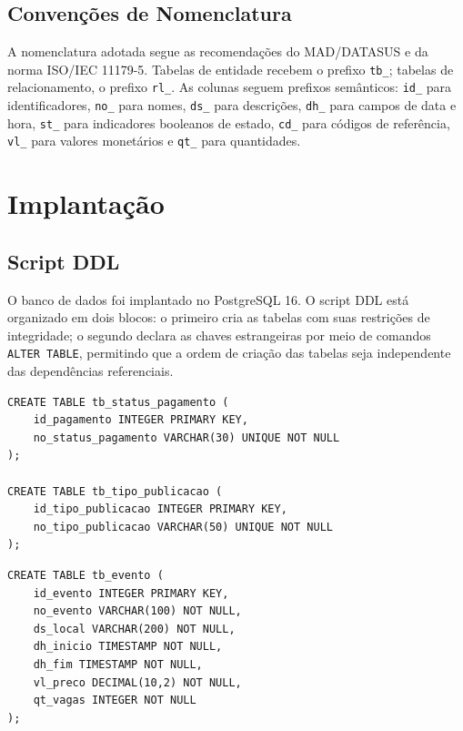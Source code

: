 \documentclass[12pt,a4paper]{article}
\begin{document}
\subsection{Convenções de Nomenclatura}
\label{subsec:nomenclatura}

A nomenclatura adotada segue as recomendações do MAD/DATASUS e da norma ISO/IEC 11179-5. Tabelas de entidade recebem o prefixo \texttt{tb\_}; tabelas de relacionamento, o prefixo \texttt{rl\_}. As colunas seguem prefixos semânticos: \texttt{id\_} para identificadores, \texttt{no\_} para nomes, \texttt{ds\_} para descrições, \texttt{dh\_} para campos de data e hora, \texttt{st\_} para indicadores booleanos de estado, \texttt{cd\_} para códigos de referência, \texttt{vl\_} para valores monetários e \texttt{qt\_} para quantidades.

\section{Implantação}
\label{sec:implantacao}

\subsection{Script DDL}
\label{subsec:ddl}

O banco de dados foi implantado no PostgreSQL 16. O script DDL está organizado em dois blocos: o primeiro cria as tabelas com suas restrições de integridade; o segundo declara as chaves estrangeiras por meio de comandos \texttt{ALTER TABLE}, permitindo que a ordem de criação das tabelas seja independente das dependências referenciais.

\noindent\begin{minipage}{\linewidth}
\begin{lstlisting}[caption={DDL --- tabelas de domínio \texttt{tb\_status\_pagamento} e \texttt{tb\_tipo\_publicacao}.}, label={lst:ddl-dominio}]
CREATE TABLE tb_status_pagamento (
    id_pagamento INTEGER PRIMARY KEY,
    no_status_pagamento VARCHAR(30) UNIQUE NOT NULL
);

CREATE TABLE tb_tipo_publicacao (
    id_tipo_publicacao INTEGER PRIMARY KEY,
    no_tipo_publicacao VARCHAR(50) UNIQUE NOT NULL
);
\end{lstlisting}
\end{minipage}

\noindent\begin{minipage}{\linewidth}
\begin{lstlisting}[caption={DDL --- entidade \texttt{tb\_evento}.}, label={lst:ddl-evento}]
CREATE TABLE tb_evento (
    id_evento INTEGER PRIMARY KEY,
    no_evento VARCHAR(100) NOT NULL,
    ds_local VARCHAR(200) NOT NULL,
    dh_inicio TIMESTAMP NOT NULL,
    dh_fim TIMESTAMP NOT NULL,
    vl_preco DECIMAL(10,2) NOT NULL,
    qt_vagas INTEGER NOT NULL
);
\end{lstlisting}
\end{minipage}
\end{document}
